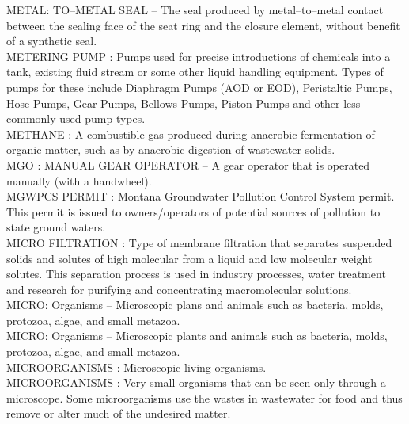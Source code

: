 \vspace{0.15cm}
METAL: TO–METAL SEAL –  The seal produced by metal–to–metal contact between the sealing face of the seat ring and the closure element, without benefit of a synthetic seal.\\
\vspace{0.15cm}
METERING PUMP :   Pumps used for precise introductions of chemicals into a tank, existing fluid stream or some other liquid handling equipment. Types of pumps for these include Diaphragm Pumps (AOD or EOD), Peristaltic Pumps, Hose Pumps, Gear Pumps, Bellows Pumps, Piston Pumps and other less commonly used pump types.\\
\vspace{0.15cm}
METHANE :  A combustible gas produced during anaerobic fermentation of organic matter, such as by anaerobic digestion of wastewater solids.\\
\vspace{0.15cm}
MGO :  MANUAL GEAR OPERATOR –  A gear operator that is operated manually (with a handwheel).\\
\vspace{0.15cm}
MGWPCS PERMIT :  Montana Groundwater Pollution Control System permit. This permit is issued to owners/operators of potential sources of pollution to state ground waters.\\
\vspace{0.15cm}
MICRO FILTRATION :  Type of membrane filtration that separates suspended solids and solutes of high molecular from a liquid and low molecular weight solutes. This separation process is used in industry processes, water treatment and research for purifying and concentrating macromolecular solutions.\\
\vspace{0.15cm}
MICRO: Organisms –  Microscopic plans and animals such as bacteria, molds, protozoa, algae, and small metazoa.\\
\vspace{0.15cm}
MICRO: Organisms –  Microscopic plants and animals such as bacteria, molds, protozoa, algae, and small metazoa.\\
\vspace{0.15cm}
MICROORGANISMS :  Microscopic living organisms.\\
\vspace{0.15cm}
MICROORGANISMS :  Very small organisms that can be seen only through a microscope. Some microorganisms use the wastes in wastewater for food and thus remove or alter much of the undesired matter.\\
